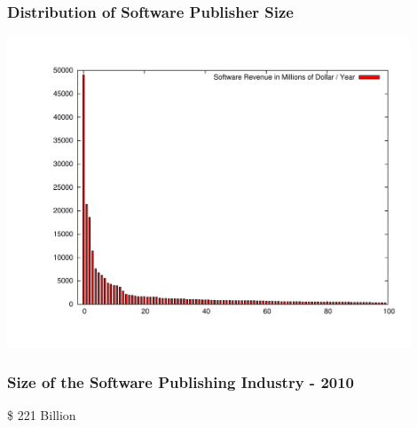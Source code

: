 \documentclass[18pt]{beamer}
\begin{document}
\begin{frame}
\frametitle{Distribution of Software Publisher Size}
  \includegraphics[width=0.9\textwidth,height=0.9\paperheight]{../Art/LargestSoftwarePublishersPlot.pdf}
\end{frame}


\begin{frame}
\frametitle{Size of the Software Publishing Industry - 2010}
\fontsize{72pt}{90pt}\selectfont
\begin{center}
\$ 221 Billion
\end{center}
\end{frame}


{
\begin{frame}[plain]
\end{frame}
}
\end{document}
